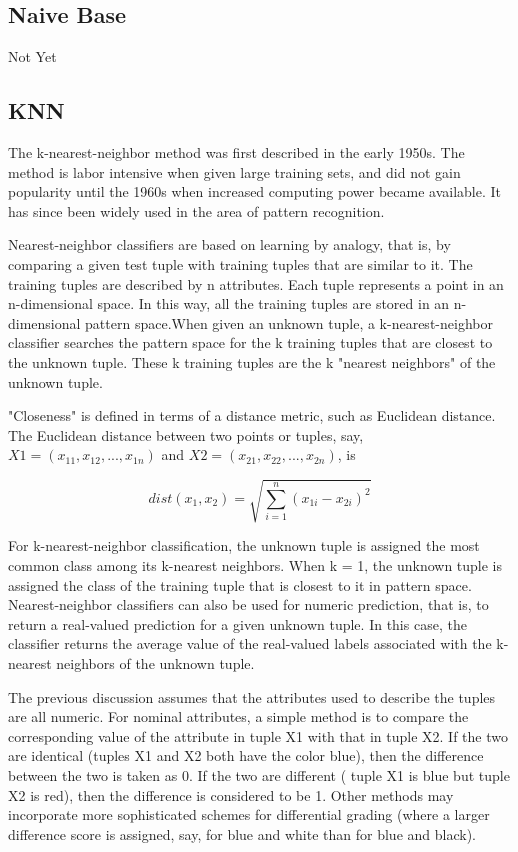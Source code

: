 \subsection{Naive Base}
Not Yet \bigskip

\subsection{KNN}
The k-nearest-neighbor method \cite{classifications} was first described in the early 1950s. The method is labor intensive when given large training sets, and did not gain popularity until the 1960s when increased computing power became available. It has since been widely used in the area of pattern recognition. \bigskip

Nearest-neighbor classifiers are based on learning by analogy, that is, by comparing a given test tuple with training tuples that are similar to it. The training tuples are described by n attributes. Each tuple represents a point in an n-dimensional space. In this way, all the training tuples are stored in an n-dimensional pattern space.When given an unknown tuple, a k-nearest-neighbor classifier searches the pattern space for the k training tuples that are closest to the unknown tuple. These k training tuples are the k "nearest neighbors" of the unknown tuple.
\bigskip

"Closeness" is defined in terms of a distance metric, such as Euclidean distance. The
Euclidean distance between two points or tuples, say, $X1 =( x_{11}, x_{12},..., x_{1n})$ and $X2=(x_{21}, x_{22},..., x_{2n})$, is

\begin{dBox}
\begin{equation}
dist(x_1, x_2) = \sqrt{\sum_{i=1}^{n}(x_{1i}-x_{2i})^2}
\end{equation}
\end{dBox}


For k-nearest-neighbor classification, the unknown tuple is assigned the most common class among its k-nearest neighbors. When k = 1, the unknown tuple is assigned the class of the training tuple that is closest to it in pattern space. Nearest-neighbor classifiers can also be used for numeric prediction, that is, to return a real-valued prediction
for a given unknown tuple. In this case, the classifier returns the average value of the real-valued labels associated with the k-nearest neighbors of the unknown tuple.\bigskip

The previous discussion assumes that the attributes used
to describe the tuples are all numeric. For nominal attributes, a simple method is to compare the corresponding value of the attribute in tuple X1 with that in tuple X2. If
the two are identical (tuples X1 and X2 both have the color blue), then the difference between the two is taken as 0. If the two are different ( tuple X1 is blue but tuple X2 is red), then the difference is considered to be 1. Other methods may incorporate more sophisticated schemes for differential grading (where a larger difference score is assigned, say, for blue and white than for blue and black).\bigskip

